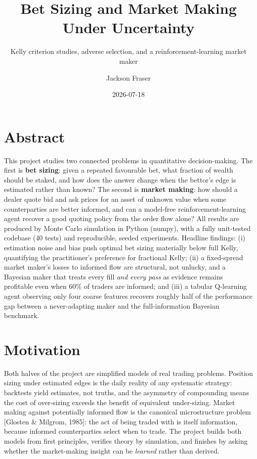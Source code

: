 \documentclass[
  letterpaper,
  DIV=11,
  numbers=noendperiod]{scrartcl}
\title{Bet Sizing and Market Making Under Uncertainty}
\subtitle{Kelly criterion studies, adverse selection, and a
reinforcement-learning market maker}
\author{Jackson Fraser}
\date{2026-07-18}
\renewcommand*\contentsname{Table of contents}
\newcommand\contentsname{Table of contents}
\begin{document}
\maketitle

\renewcommand*\contentsname{Table of contents}
{
\setcounter{tocdepth}{3}
\tableofcontents
}

\section*{Abstract}\label{abstract}

This project studies two connected problems in quantitative
decision-making. The first is \textbf{bet sizing}: given a repeated
favourable bet, what fraction of wealth should be staked, and how does
the answer change when the bettor's edge is estimated rather than known?
The second is \textbf{market making}: how should a dealer quote bid and
ask prices for an asset of unknown value when some counterparties are
better informed, and can a model-free reinforcement-learning agent
recover a good quoting policy from the order flow alone? All results are
produced by Monte Carlo simulation in Python (numpy), with a fully
unit-tested codebase (40 tests) and reproducible, seeded experiments.
Headline findings: (i) estimation noise and bias push optimal bet sizing
materially below full Kelly, quantifying the practitioner's preference
for fractional Kelly; (ii) a fixed-spread market maker's losses to
informed flow are structural, not unlucky, and a Bayesian maker that
treats every fill \emph{and every pass} as evidence remains profitable
even when 60\% of traders are informed; and (iii) a tabular Q-learning
agent observing only four coarse features recovers roughly half of the
performance gap between a never-adapting maker and the full-information
Bayesian benchmark.

\section{Motivation}\label{motivation}

Both halves of the project are simplified models of real trading
problems. Position sizing under estimated edges is the daily reality of
any systematic strategy: backtests yield estimates, not truths, and the
asymmetry of compounding means the cost of over-sizing exceeds the
benefit of equivalent under-sizing. Market making against potentially
informed flow is the canonical microstructure problem {[}Glosten \&
Milgrom, 1985{]}: the act of being traded with is itself information,
because informed counterparties select when to trade. The project builds
both models from first principles, verifies theory by simulation, and
finishes by asking whether the market-making insight can be
\emph{learned} rather than derived.
\end{document}
